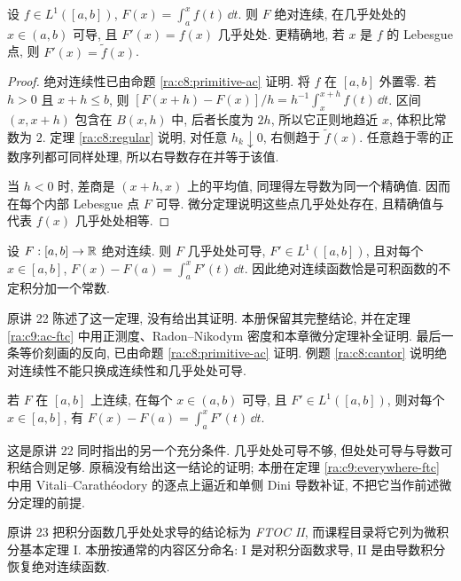 
\begin{theorem}\label{ra:c8:ftc}
设 $f\in L^1([a,b])$, $F(x)=\int_a^xf(t)\,\dd t$. 则 $F$ 绝对连续, 在几乎处处的 $x\in(a,b)$ 可导, 且 $F'(x)=f(x)$ 几乎处处. 更精确地, 若 $x$ 是 $f$ 的 Lebesgue 点, 则 $F'(x)=\widetilde f(x)$.
\end{theorem}
\begin{proof}
绝对连续性已由命题 \ref{ra:c8:primitive-ac} 证明. 将 $f$ 在 $[a,b]$ 外置零. 若 $h>0$ 且 $x+h\le b$, 则
$[F(x+h)-F(x)]/h=h^{-1}\int_x^{x+h}f(t)\,\dd t$.
区间 $(x,x+h)$ 包含在 $B(x,h)$ 中, 后者长度为 $2h$, 所以它正则地趋近 $x$, 体积比常数为 $2$. 定理 \ref{ra:c8:regular} 说明, 对任意 $h_k\downarrow0$, 右侧趋于 $\widetilde f(x)$. 任意趋于零的正数序列都可同样处理, 所以右导数存在并等于该值.

当 $h<0$ 时, 差商是 $(x+h,x)$ 上的平均值, 同理得左导数为同一个精确值. 因而在每个内部 Lebesgue 点 $F$ 可导. 微分定理说明这些点几乎处处存在, 且精确值与代表 $f(x)$ 几乎处处相等.
\end{proof}

\begin{theorem}[绝对连续版微积分基本定理 II]\label{ra:c8:ac-inverse}
设 $F:[a,b]\to\mathbb R$ 绝对连续. 则 $F$ 几乎处处可导, $F'\in L^1([a,b])$, 且对每个 $x\in[a,b]$,
$F(x)-F(a)=\int_a^xF'(t)\,\dd t$.
因此绝对连续函数恰是可积函数的不定积分加一个常数.
\end{theorem}

原讲 22 陈述了这一定理, 没有给出其证明. 本册保留其完整结论, 并在定理 \ref{ra:c9:ac-ftc} 中用正测度、Radon--Nikodym 密度和本章微分定理补全证明. 最后一条等价刻画的反向, 已由命题 \ref{ra:c8:primitive-ac} 证明. 例题 \ref{ra:c8:cantor} 说明绝对连续性不能只换成连续性和几乎处处可导.

\begin{proposition}[处处可导时的充分条件]\label{ra:c8:everywhere}
若 $F$ 在 $[a,b]$ 上连续, 在每个 $x\in(a,b)$ 可导, 且 $F'\in L^1([a,b])$, 则对每个 $x\in[a,b]$, 有
$F(x)-F(a)=\int_a^xF'(t)\,\dd t$.
\end{proposition}

这是原讲 22 同时指出的另一个充分条件. 几乎处处可导不够, 但处处可导与导数可积结合则足够. 原稿没有给出这一结论的证明; 本册在定理 \ref{ra:c9:everywhere-ftc} 中用 Vitali--Carathéodory 的逐点上逼近和单侧 Dini 导数补证, 不把它当作前述微分定理的前提.

\begin{remark}
原讲 23 把积分函数几乎处处求导的结论标为 \textit{FTOC II}, 而课程目录将它列为微积分基本定理 I. 本册按通常的内容区分命名: I 是对积分函数求导, II 是由导数积分恢复绝对连续函数.
\end{remark}

